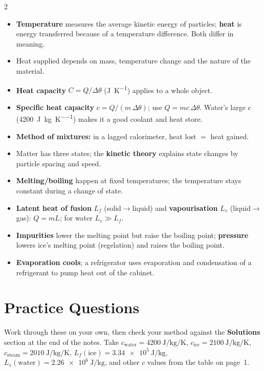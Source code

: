 \documentclass[10pt]{article}
\makeatletter
\let\theme@oldsection\section
\renewcommand{\section}{%
  \needspace{8\baselineskip}%
  \theme@oldsection}
\makeatother
\begin{document}
\begin{multicols}{2}
\begin{tcolorbox}[breakable,enhanced,colback=defbg,colframe=defblue,
  coltitle=white,fonttitle=\bfseries,title=Chapter Summary,
  boxrule=0.6pt,arc=2pt]
\begin{itemize}[leftmargin=*,nosep]
  \item \textbf{Temperature} measures the average kinetic energy of
        particles; \textbf{heat} is energy transferred because of a
        temperature difference. Both differ in meaning.
  \item Heat supplied depends on mass, temperature change and the nature
        of the material.
  \item \textbf{Heat capacity} $C = Q/\Delta\theta$
        (\si{\joule\per\kelvin}) applies to a whole object.
  \item \textbf{Specific heat capacity} $c = Q/(m\,\Delta\theta)$; use
        $Q = m c\,\Delta\theta$. Water's large $c$
        (\SI{4200}{\joule\per\kilogram\per\kelvin}) makes it a good
        coolant and heat store.
  \item \textbf{Method of mixtures:} in a lagged calorimeter,
        heat lost $=$ heat gained.
  \item Matter has three states; the \textbf{kinetic theory} explains
        state changes by particle spacing and speed.
  \item \textbf{Melting/boiling} happen at fixed temperatures; the
        temperature stays constant during a change of state.
  \item \textbf{Latent heat of fusion} $L_f$ (solid$\to$liquid) and
        \textbf{vapourisation} $L_v$ (liquid$\to$gas): $Q = mL$; for
        water $L_v \gg L_f$.
  \item \textbf{Impurities} lower the melting point but raise the
        boiling point; \textbf{pressure} lowers ice's melting point
        (regelation) and raises the boiling point.
  \item \textbf{Evaporation cools}; a refrigerator uses evaporation and
        condensation of a refrigerant to pump heat out of the cabinet.
\end{itemize}
\end{tcolorbox}

\section{Practice Questions}
Work through these on your own, then check your method against the
\textbf{Solutions} section at the end of the notes. Take
$c_{\text{water}}=\SI{4200}{\joule\per\kilogram\per\kelvin}$,
$c_{\text{ice}}=\SI{2100}{\joule\per\kilogram\per\kelvin}$,
$c_{\text{steam}}=\SI{2010}{\joule\per\kilogram\per\kelvin}$,
$L_f(\text{ice})=\SI{3.34e5}{\joule\per\kilogram}$,
$L_v(\text{water})=\SI{2.26e6}{\joule\per\kilogram}$, and other $c$
values from the table on page~1.


\end{multicols}
\end{document}
